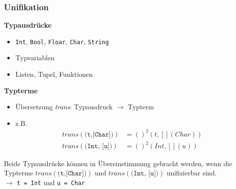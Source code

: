 \documentclass{beamer}
\begin{document}
\begin{frame}[fragile] \frametitle{Unifikation}
	\footnotesize
	\textbf{Typausdrücke}
	\begin{itemize}
		\item \texttt{Int}, \texttt{Bool}, \texttt{Floar}, \texttt{Char}, \texttt{String}
		\item Typvariablen
		\item Listen, Tupel, Funktionen
	\end{itemize}

	\textbf{Typterme}
	\begin{itemize}
		\item Übersetzung \textit{trans}: Typausdruck $\to$ Typterm
		\pause
		\item z.B.
		\begin{equation*}
			\begin{aligned}
				trans(\texttt{(t,[Char])}) &= ()^2(t, [](Char)) \\
				trans(\texttt{(Int, [u])}) &= ()^2(Int, [](u))
			\end{aligned}
		\end{equation*}
	\end{itemize}

	\pause
	
	Beide Typausdrücke können in Übereinstimmung gebracht werden, wenn die Typterme $trans(\texttt{(t,[Char])})$ und $trans(\texttt{(Int, [u])})$ unifizierbar sind.
	\\ \pause
	$\to$ \texttt{t = Int} und \texttt{u = Char}
\end{frame}
\end{document}
